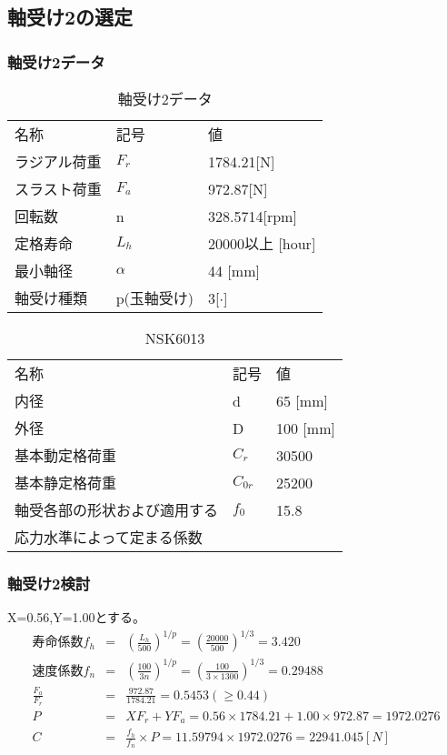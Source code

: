 \newpage
\subsection{軸受け2の選定}
\subsubsection{軸受け2データ}
\begin{table}[htb]
\begin{center}
  \caption{軸受け2データ}
  \begin{tabular}{lll} \hline
名称&記号&値\\
ラジアル荷重&$F_r$&1784.21[N]\\
スラスト荷重&$F_a$&972.87[N]\\
回転数&n&328.5714[rpm]\\
定格寿命&$L_h$&20000以上 [hour]\\
最小軸径&$\alpha$&44 [mm]\\
軸受け種類&p(玉軸受け)&3[$\cdot$]\\
\hline
  \end{tabular}
\end{center}
\end{table}

\begin{table}[htb]
\begin{center}
  \caption{NSK6013}
  \begin{tabular}{lll} \hline
名称&記号&値\\
内径& d &65 [mm]\\
外径& D &100 [mm]\\
基本動定格荷重&$C_{r}$&30500\\
基本静定格荷重&$C_{0r}$&25200\\
軸受各部の形状および適用する&$f_0$&15.8\\
応力水準によって定まる係数&&\\
\hline
  \end{tabular}
\end{center}
\end{table}


\subsubsection{軸受け2検討}
X=0.56,Y=1.00とする。
\begin{eqnarray}
寿命係数f_h &=& \left( \frac{L_h}{500} \right)^{1/p} = \left( \frac{20000}{500} \right)^{1/3} = 3.420\\
速度係数f_n &=& \left( \frac{100}{3n} \right)^{1/p} = \left( \frac{100}{3 \times 1300} \right)^{1/3} = 0.29488\\
\frac{F_a}{F_r} &=& \frac{972.87}{1784.21} = 0.5453(\geq 0.44)\\
P &=& XF_r+YF_a = 0.56 \times 1784.21 + 1.00 \times 972.87 = 1972.0276\\
C &=& \frac{f_h}{f_n} \times P = 11.59794 \times 1972.0276 = 22941.045[N]
\end{eqnarray}

